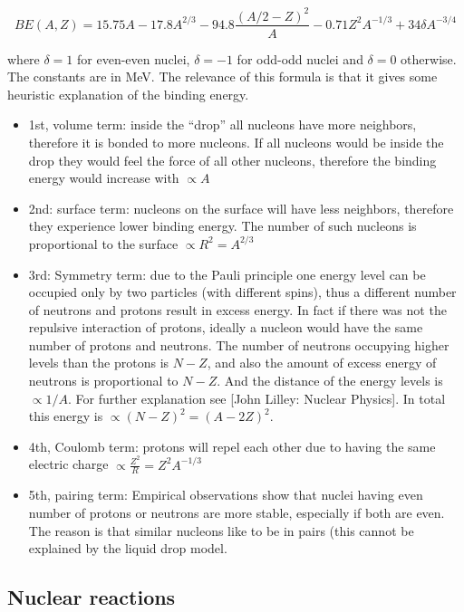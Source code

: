 \begin{equation}
BE(A,Z)=15.75A-17.8A^{2/3}-94.8\frac{(A/2 - Z)^2}{A}-0.71Z^2A^{-1/3}+34\delta A^{-3/4}
\end{equation}

where $\delta = 1$ for even-even nuclei, $\delta = -1$ for odd-odd nuclei and $\delta = 0$ otherwise. The constants are in MeV. The relevance of this formula is that it gives some heuristic explanation of the binding energy.

\begin{itemize}
\item 1st, volume term: inside the ``drop'' all nucleons have more neighbors, therefore it is bonded to more nucleons. If all nucleons would be inside the drop they would feel the force of all other nucleons, therefore the binding energy would increase with $\propto A$
\item 2nd: surface term: nucleons on the surface will have less neighbors, therefore they experience lower binding energy. The number of such nucleons is proportional to the surface $\propto R^2=A^{2/3}$
\item 3rd: Symmetry term: due to the Pauli principle one energy level can be occupied only by two particles (with different spins), thus a different number of neutrons and protons result in excess energy. In fact if there was not the repulsive interaction of protons, ideally a nucleon would have the same number of protons and neutrons. The number of neutrons occupying higher levels than the protons is $N-Z$, and also the amount of excess energy of neutrons is proportional to $N-Z$. And the distance of the energy levels is $\propto 1/A$. For further explanation see [John Lilley: Nuclear Physics]. In total this energy is $\propto (N-Z)^2=(A-2Z)^2$. 
\item 4th, Coulomb term: protons will repel each other due to having the same electric charge $\propto \frac{Z^2}{R}=Z^2A^{-1/3}$
\item 5th, pairing term: Empirical observations show that nuclei having even number of protons or neutrons are more stable, especially if both are even. The reason is that similar nucleons like to be in pairs (this cannot be explained by the liquid drop model. 
\end{itemize}
 

\subsection{Nuclear reactions}

